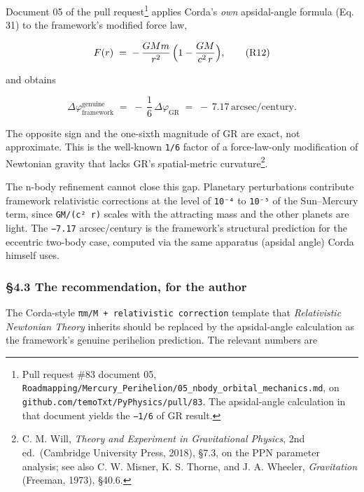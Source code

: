 \documentclass[
  11pt,
]{article}
\begin{document}
Document 05 of the pull request\footnote{Pull request \#83 document 05,
  \texttt{Roadmapping/Mercury\_Perihelion/05\_nbody\_orbital\_mechanics.md},
  on \texttt{github.com/temoTxt/PyPhysics/pull/83}. The apsidal-angle
  calculation in that document yields the \texttt{−1/6} of GR result.}
applies Corda's \emph{own} apsidal-angle formula (Eq. 31) to the
framework's modified force law,

\[
F(r) \;=\; -\,\frac{G M m}{r^{2}}\,\Bigl(1 - \frac{GM}{c^{2}\,r}\Bigr), \tag{R12}
\]

and obtains

\[
\Delta\varphi^{\text{genuine}}_{\text{framework}}
\;=\; -\,\frac{1}{6}\,\Delta\varphi_{\text{GR}}
\;=\; -\,7.17\,\text{arcsec/century}. \tag{R13}
\]

The opposite sign and the one-sixth magnitude of GR are exact, not
approximate. This is the well-known \texttt{1/6} factor of a
force-law-only modification of Newtonian gravity that lacks GR's
spatial-metric curvature\footnote{C. M. Will, \emph{Theory and
  Experiment in Gravitational Physics}, 2nd ed.~(Cambridge University
  Press, 2018), §7.3, on the PPN parameter analysis; see also C. W.
  Misner, K. S. Thorne, and J. A. Wheeler, \emph{Gravitation} (Freeman,
  1973), §40.6.}.

The n-body refinement cannot close this gap. Planetary perturbations
contribute framework relativistic corrections at the level of
\texttt{10⁻⁴} to \texttt{10⁻⁵} of the Sun--Mercury term, since
\texttt{GM/(c²\ r)} scales with the attracting mass and the other
planets are light. The \texttt{−7.17} arcsec/century is the framework's
structural prediction for the eccentric two-body case, computed via the
same apparatus (apsidal angle) Corda himself uses.

\hypertarget{the-recommendation-for-the-author}{%
\subsubsection{§4.3 The recommendation, for the
author}\label{the-recommendation-for-the-author}}

The Corda-style \texttt{πm/M\ +\ relativistic\ correction} template that
\emph{Relativistic Newtonian Theory} inherits should be replaced by the
apsidal-angle calculation as the framework's genuine perihelion
prediction. The relevant numbers are
\end{document}
